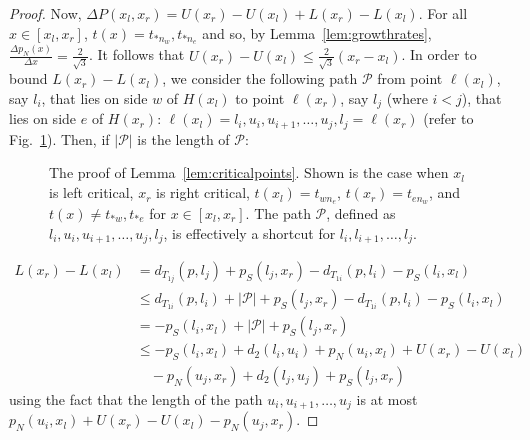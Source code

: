 \begin{proof}
Now, $\Delta P(x_l,x_r) = U(x_r) - U(x_l) + L(x_r) - L(x_l)$. For all
$x \in [x_l,x_r]$, $t(x) = t_{*n_w}, t_{*n_e}$  and so, by
Lemma~\ref{lem:growthrates},
$\frac{\Delta p_N(x)}{\Delta x} = \frac{2}{\sqrt{3}}$. It follows that
$U(x_r) - U(x_l) \leq \frac{2}{\sqrt{3}}(x_r-x_l)$. In order to bound
$L(x_r) - L(x_l)$, we consider the following path $\mathcal{P}$ from point $\ell(x_l)$,
say $l_i$, that lies on side $w$ of $H(x_l)$ to point $\ell(x_r)$, say $l_j$
(where $i < j$), that lies on side $e$ of $H(x_r)$: 
$\ell(x_l)=l_i, u_i,u_{i+1},\dots,u_j,l_j=\ell(x_r)$ (refer to Fig.~\ref{fig:pathcost}).
Then, if $|\mathcal{P}|$ is the length of $\mathcal{P}$:
\begin{figure}
\center{\pathcost}

\caption{
The proof of Lemma~\ref{lem:criticalpoints}. Shown is the case when $x_l$ is
left critical, $x_r$ is right critical, $t(x_l) = t_{wn_e}$, $t(x_r)=t_{en_w}$,
and $t(x) \not= t_{\ast w}, t_{\ast e}$ for $x \in [x_l,x_r]$. The path
$\mathcal{P}$, defined as $l_i,u_i,u_{i+1},\dots,u_j,l_j$, is effectively
a shortcut for $l_i, l_{i+1}, \dots,l_j$.
}
\label{fig:pathcost}
\end{figure}
\begin{align*}
L(x_r) - L(x_l) & = d_{T_{1j}}(p,l_j) + p_S(l_j,x_r) - d_{T_{1i}}(p,l_i) - p_S(l_i,x_l) \\
& \leq d_{T_{1i}}(p,l_i) + |\mathcal{P}| + p_S(l_j,x_r) - d_{T_{1i}}(p,l_i) -p_S(l_i,x_l) \\
& = -p_S(l_i,x_l) + |\mathcal{P}| + p_S(l_j,x_r) \\
& \leq -p_S(l_i,x_l) + d_2(l_i,u_i) + p_N(u_i,x_l) + U(x_r) - U(x_l) \\
& \quad - p_N(u_j,x_r) + d_2(l_j,u_j) + p_S(l_j,x_r)
\end{align*}
using the fact that the length of the path $u_i,u_{i+1},\dots,u_j$ is at most
$p_N(u_i,x_l) + U(x_r) - U(x_l) - p_N(u_j,x_r)$. 
%

\end{proof}
